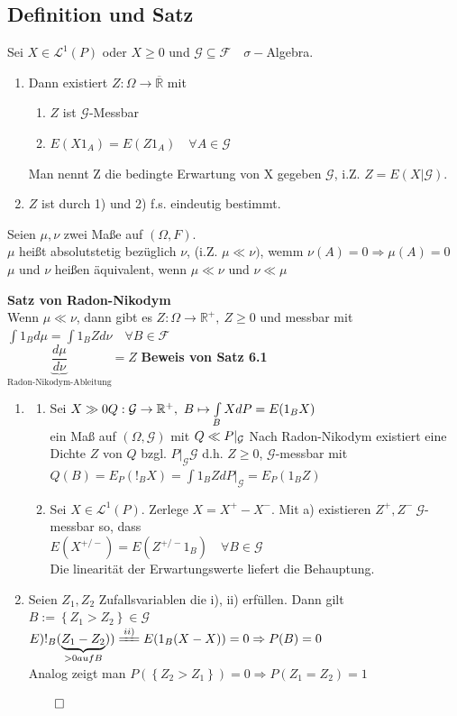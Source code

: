 \documentclass[german,10pt,oneside, fleqn, a4paper]{article}
\newcommand {\R}	{\mathbb{R}}
\newcommand{\Ra}	{\Rightarrow}
\newcommand{\ra}{\rightarrow}
\newcommand{\brac}[1]{\left\lbrace #1\right\rbrace}
\newcommand{\QED}{\begin{flushright}$\qed$\end{flushright}}
\newcommand{\mc}[1]{\mathcal{#1}}
\newcommand{\lp}[1]{\mc{L}^{#1}}
\newcommand{\1}[1]{1_{#1}}
\newcommand{\2}[1]{\1{\brac{#1}}}
\newcommand{\g}{\mc{G}}
\newcommand{\f}{\mc{F}}
\begin{document}
\subsection{Definition und Satz}
\label{6.1}
Sei $X\in\lp{1}(P)$ oder $X\geq0$ und $\g\subseteq\f\quad\sigma-$Algebra.\begin{enumerate}[label=(\alph*)]
\item Dann existiert $Z:\Omega\ra\overline{\R}$ mit \begin{enumerate}[label=(\roman*)]
\item $Z$ ist $\g$-Messbar
\item $E(X1_A)=E(Z1_A)\quad\forall A\in\g$
\end{enumerate}
Man nennt Z die bedingte Erwartung von X gegeben $\g$, i.Z. $Z=E(X|\g)$.
\item $Z$ ist durch 1) und 2) f.s. eindeutig bestimmt.
\end{enumerate}
Seien $\mu,\nu$ zwei Maße auf $(\Omega,F)$.\\
$\mu$ heißt absolutstetig bezüglich $\nu$, (i.Z. $\mu\ll\nu)$, wemm $\nu(A)=0\Ra\mu(A)=0$\\
$\mu$ und $\nu$ heißen äquivalent, wenn $\mu\ll\nu$ und $\nu\ll\mu$

\textbf{Satz von Radon-Nikodym}\\
\label{Radon}
Wenn $\mu\ll\nu$, dann gibt es $Z:\Omega\ra\R^+,\ Z\geq0$ und messbar mit $\int1_Bd\mu=\int1_BZd\nu\quad\forall B\in\f$\\
\grqq$\underbrace{\dfrac{d\mu}{d\nu}}_{\text{Radon-Nikodym-Ableitung}}$\grqq$=Z$
\textbf{Beweis von Satz 6.1}
\begin{enumerate}[label=(\alph*)]
\item \begin{enumerate}[label=(\roman*)]
\item Sei $X\gg0\\
Q:\g\ra\R^+,\ B\mapsto\int\limits_BXdP=E(1_BX)$\\
ein Maß auf $(\Omega,\g)$ mit $Q\ll P|_{\g}\\ $
Nach Radon-Nikodym existiert eine Dichte $Z$ von $Q$ bzgl. $P|_{\g} \g$ d.h. $Z\geq 0$, $\g$-messbar mit \\
$Q(B)=E_P(!_BX)=\int 1_BZdP|_{\g}=E_P(1_BZ)$
\item Sei $X\in\lp{1}(P)$. Zerlege $X=X^+-X^-$. Mit a) existieren $Z^+,Z^-\ \g$-messbar so, dass\\
$E(X^{+/-})=E(Z^{+/-}1_B)\quad\forall B\in\g$\\
Die linearität der Erwartungswerte liefert die Behauptung.
\end{enumerate}
\item Seien $Z_1,Z_2$ Zufallsvariablen die i), ii) erfüllen. Dann gilt\\
$B:=\brac{Z_1>Z_2}\in\g$\\
$E)!_B(\underbrace{Z_1-Z_2}_{>0 auf B}))\xlongequal{ii)}E(1_B(X-X))=0\\
\Ra P(B)=0$\\
Analog zeigt man $P(\brac{Z_2>Z_1})=0\Ra P(Z_1=Z_2)=1$\QED
\end{enumerate}
\end{document}
